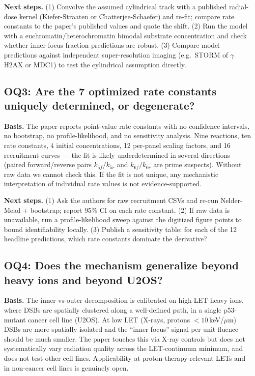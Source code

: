 \textbf{Next steps.}
(1) Convolve the assumed cylindrical track with a published radial-dose kernel
(Kiefer-Straaten or Chatterjee-Schaefer) and re-fit; compare rate constants to the paper's
published values and quote the shift.
(2) Run the model with a euchromatin/heterochromatin bimodal substrate concentration and
check whether inner-focus fraction predictions are robust.
(3) Compare model predictions against independent super-resolution imaging (e.g.\ STORM of
$\gamma$H2AX or MDC1) to test the cylindrical assumption directly.

\subsection*{OQ3: Are the 7 optimized rate constants uniquely determined, or degenerate?}
\textbf{Basis.} The paper reports point-value rate constants with no confidence intervals,
no bootstrap, no profile-likelihood, and no sensitivity analysis. Nine reactions, ten rate
constants, 4 initial concentrations, 12 per-panel scaling factors, and 16 recruitment
curves --- the fit is likely underdetermined in several directions (paired forward/reverse
pairs $k_{5f}/k_{5r}$ and $k_{6f}/k_{6r}$ are prime suspects). Without raw data we cannot
check this. If the fit is not unique, any mechanistic interpretation of individual rate
values is not evidence-supported.

\textbf{Next steps.}
(1) Ask the authors for raw recruitment CSVs and re-run Nelder-Mead + bootstrap; report
95\% CI on each rate constant.
(2) If raw data is unavailable, run a profile-likelihood sweep against the digitized figure
points to bound identifiability locally.
(3) Publish a sensitivity table: for each of the 12 headline predictions, which rate
constants dominate the derivative?

\subsection*{OQ4: Does the mechanism generalize beyond heavy ions and beyond U2OS?}
\textbf{Basis.} The inner-vs-outer decomposition is calibrated on high-LET heavy ions,
where DSBs are spatially clustered along a well-defined path, in a single p53-mutant cancer
cell line (U2OS). At low LET (X-rays, protons $<10$\,keV/$\mu$m) DSBs are more spatially
isolated and the ``inner focus'' signal per unit fluence should be much smaller. The paper
touches this via X-ray controls but does not systematically vary radiation quality across
the LET-continuum minimum, and does not test other cell lines. Applicability at
proton-therapy-relevant LETs and in non-cancer cell lines is genuinely open.

